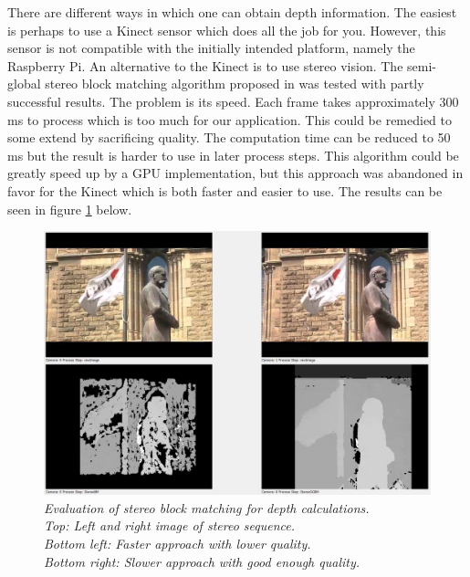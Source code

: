 
There are different ways in which one can obtain depth information. The easiest is perhaps to use a Kinect sensor which does all the job for you. However, this sensor is not compatible with the initially intended platform, namely the Raspberry Pi. An alternative to the Kinect is to use stereo vision. The semi-global stereo block matching algorithm proposed in \cite{StereoBM} was tested with partly successful results. The problem is its speed. Each frame takes approximately 300 ms to process which is too much for our application. This could be remedied to some extend by sacrificing quality. The computation time can be reduced to 50 ms but the result is harder to use in later process steps. This algorithm could be greatly speed up by a GPU implementation, but this approach was abandoned in favor for the Kinect which is both faster and easier to use. The results can be seen in figure \ref{fig:Stereo} below.

\vspace{1cm}
\begin{figure}[htb]
	\includegraphics[width=\linewidth]{images/stereoComp.png}
	\caption[An example of depth images calculated from a stereo sequence]{\textit{Evaluation of stereo block matching for depth calculations.\\ 
	Top: Left and right image of stereo sequence.\\ 
	Bottom left: Faster approach with lower quality.\\ 
	Bottom right: Slower approach with good enough quality.}}
	\label{fig:Stereo}  %
\end{figure}
\newpage

